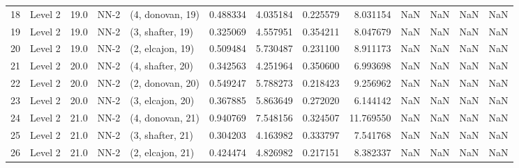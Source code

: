 \begin{tabular}{llrllrrrrrrrr}
18 &   Level 2 &   19.0 &        NN-2 &  (4, donovan, 19) &   0.488334 &   4.035184 &  0.225579 &   8.031154 &                  NaN &                    NaN &                 NaN &                   NaN \\
19 &   Level 2 &   19.0 &        NN-2 &  (3, shafter, 19) &   0.325069 &   4.557951 &  0.354211 &   8.047679 &                  NaN &                    NaN &                 NaN &                   NaN \\
20 &   Level 2 &   19.0 &        NN-2 &  (2, elcajon, 19) &   0.509484 &   5.730487 &  0.231100 &   8.911173 &                  NaN &                    NaN &                 NaN &                   NaN \\
21 &   Level 2 &   20.0 &        NN-2 &  (4, shafter, 20) &   0.342563 &   4.251964 &  0.350600 &   6.993698 &                  NaN &                    NaN &                 NaN &                   NaN \\
22 &   Level 2 &   20.0 &        NN-2 &  (2, donovan, 20) &   0.549247 &   5.788273 &  0.218423 &   9.256962 &                  NaN &                    NaN &                 NaN &                   NaN \\
23 &   Level 2 &   20.0 &        NN-2 &  (3, elcajon, 20) &   0.367885 &   5.863649 &  0.272020 &   6.144142 &                  NaN &                    NaN &                 NaN &                   NaN \\
24 &   Level 2 &   21.0 &        NN-2 &  (4, donovan, 21) &   0.940769 &   7.548156 &  0.324507 &  11.769550 &                  NaN &                    NaN &                 NaN &                   NaN \\
25 &   Level 2 &   21.0 &        NN-2 &  (3, shafter, 21) &   0.304203 &   4.163982 &  0.333797 &   7.541768 &                  NaN &                    NaN &                 NaN &                   NaN \\
26 &   Level 2 &   21.0 &        NN-2 &  (2, elcajon, 21) &   0.424474 &   4.826982 &  0.217151 &   8.382337 &                  NaN &                    NaN &                 NaN &                   NaN \\
\bottomrule
\end{tabular}

